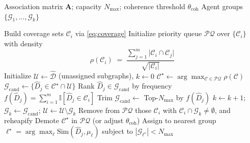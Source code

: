 \documentclass[sigconf]{acmart}
\begin{document}
\begin{algorithm}[H]
\caption{Question-Centric Agent--Subgraph Allocation}
\label{alg:alg_as}
\begin{algorithmic}[1]
\Require Association matrix \(\mathbf{A}\); capacity \(N_{\max}\);
         coherence threshold \(\theta_{\text{coh}}\)
\Ensure Agent groups \(\{\mathcal{G}_1,\ldots,\mathcal{G}_k\}\)

\State Build coverage sets \(\mathcal{C}_i\) via \eqref{eq:coverage}
\State Initialize priority queue \(\mathcal{PQ}\) over \(\{\mathcal{C}_i\}\) with density
\[
\rho(\mathcal{C}_i)
\;=\;
\frac{\sum_{j=1}^{m}\bigl|\mathcal{C}_i \cap \mathcal{C}_j\bigr|}{\sqrt{|\mathcal{C}_i|}}
\]
\State Initialize \(\mathcal{U}\leftarrow \hat{\mathcal{D}}\) (unassigned subgraphs), \(k\leftarrow 0\)
    \State \(\mathcal{C}^\star \leftarrow \arg\max_{\mathcal{C}\in\mathcal{PQ}} \rho(\mathcal{C})\)
    \State \(\mathcal{G}_{\text{cand}} \leftarrow \{\hat{D}_j \in \mathcal{C}^\star \cap \mathcal{U}\}\)
        \State Rank \(\hat{D}_j \in \mathcal{G}_{\text{cand}}\) by frequency
        \(f(\hat{D}_j)=\sum_{i=1}^{m}\mathbb{I}[\hat{D}_j\in\mathcal{C}_i]\)
        \State Trim \(\mathcal{G}_{\text{cand}} \leftarrow\) Top-\(N_{\max}\) by \(f(\hat{D}_j)\)
    \EndIf
        \State \(k\leftarrow k+1\); \(\mathcal{G}_k \leftarrow \mathcal{G}_{\text{cand}}\); \(\mathcal{U}\leftarrow \mathcal{U}\setminus \mathcal{G}_k\)
        \State Remove from \(\mathcal{PQ}\) those \(\mathcal{C}_i\) with \(\mathcal{C}_i\cap \mathcal{G}_k \neq \emptyset\), and reheapify
    \Else
        \State Demote \(\mathcal{C}^\star\) in \(\mathcal{PQ}\) (or adjust \(\theta_{\text{coh}}\))
    \EndIf
\EndWhile
{} 
    \State Assign to nearest group
    \(
    \ell^\star=\arg\max_{\ell} \text{Sim}(\hat{D}_j,\mu_\ell)
    \)
    subject to \(|\mathcal{G}_{\ell^\star}|<N_{\max}\)
\EndFor
\end{algorithmic}
\end{algorithm}



\end{document}
